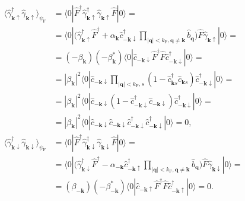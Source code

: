 \documentclass[english, parskip=full]{scrartcl}
\renewcommand{\bra}{}
\renewcommand{\braket}{}
\newcommand{\kla}{}
\newcommand{\tecxt}{}
\begin{document}
\begin{align}
\bra\langle \hat{\gamma}_{\mathbf{k}\uparrow}^\dagger \hat{\gamma}_{\mathbf{k}\uparrow} \rangle_{\psi_\tecxt\text{F}} &= \braket\langle 0 | \hat{F}^\dagger \hat{\gamma}_{\mathbf{k}\uparrow}^\dagger \hat{\gamma}_{\mathbf{k}\uparrow} \hat{F} | 0 \rangle = \\
&= \braket\langle 0 | \kla\Big( \hat{\gamma}_{\mathbf{k}\uparrow}^\dagger \hat{F}^\dagger + \alpha_\textbf{k} \hat{c}_{-\textbf{k}\downarrow}^\dagger \prod_{|\textbf{q}| < k_\tecxt\text{F}, \textbf{q}\neq \textbf{k}} \hat{b}_{\textbf{q}}  \Big) \hat{F} \hat{\gamma}_{\mathbf{k}\uparrow} | 0 \rangle = \\
&= (-\beta_\textbf{k}) (-\beta_\textbf{k}^\ast) \braket\langle 0 |  \hat{c}_{-\textbf{k}\downarrow} \hat{F}^\dagger\hat{F} \hat{c}_{-\textbf{k}\downarrow}^\dagger | 0 \rangle = \\
&= |\beta_\textbf{k}|^2  \braket\langle 0 | \hat{c}_{-\textbf{k}\downarrow} \prod_{|\textbf{q}| < k_\tecxt\text{F},s} \kla\left( 1 - \hat{c}_{\textbf{k}s}^\dagger \hat{c}_{\textbf{k}s} \right) \hat{c}_{-\textbf{k}\downarrow}^\dagger | 0 \rangle = \\
&= |\beta_\textbf{k}|^2 \braket\langle 0 | \hat{c}_{-\textbf{k}\downarrow} \kla\left( 1 - \hat{c}_{-\textbf{k}\downarrow}^\dagger \hat{c}_{-\textbf{k}\downarrow}  \right) \hat{c}_{-\textbf{k}\downarrow}^\dagger  | 0 \rangle = \\
&= |\beta_\textbf{k}|^2 \braket\langle 0 | \hat{c}_{-\textbf{k}\downarrow} \hat{c}_{-\textbf{k}\downarrow} \hat{c}_{-\textbf{k}\downarrow}^\dagger \hat{c}_{-\textbf{k}\downarrow}^\dagger   | 0 \rangle = 0,\\
\bra\langle \hat{\gamma}_{\mathbf{k}\downarrow}^\dagger \hat{\gamma}_{\mathbf{k}\downarrow} \rangle_{\psi_\tecxt\text{F}} &= \braket\langle 0 | \hat{F}^\dagger \hat{\gamma}_{\mathbf{k}\downarrow}^\dagger \hat{\gamma}_{\mathbf{k}\downarrow} \hat{F} | 0 \rangle = \\
&= \braket\langle 0 | \kla\Big( \hat{\gamma}_{\mathbf{k}\downarrow}^\dagger \hat{F}^\dagger - \alpha_{-\textbf{k}} \hat{c}_{-\textbf{k}\uparrow}^\dagger \prod_{|\textbf{q}| < k_\tecxt\text{F}, \textbf{q}\neq \textbf{k}} \hat{b}_{\textbf{q}}  \Big) \hat{F} \hat{\gamma}_{\mathbf{k}\downarrow} | 0 \rangle = \\
&= (\beta_{-\textbf{k}}) (-\beta_{-\textbf{k}}^\ast) \braket\langle 0 |  \hat{c}_{-\textbf{k}\uparrow} \hat{F}^\dagger\hat{F} \hat{c}_{-\textbf{k}\uparrow}^\dagger | 0 \rangle = 0.
\end{align}
\end{document}
